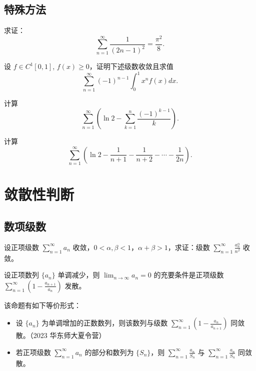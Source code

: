 \documentclass[lang=cn,10pt,thmcnt=section]{elegantbook}
\begin{document}
\subsection{特殊方法}
\begin{example}
	求证：
\[
\sum_{n=1}^{\infty} \frac{1}{(2n-1)^2} = \frac{\pi^2}{8}.
\]
\end{example}
\begin{example}
	设 $f \in C^1[0,1]$, $f(x) \geq 0$，证明下述级数收敛且求值
\[
\sum_{n=1}^{\infty} (-1)^{n-1} \int_0^1 x^n f(x) dx.
\]
\end{example}
\begin{example}
	计算
\[
\sum_{n=1}^{\infty} \left( \ln 2 - \sum_{k=1}^n \frac{(-1)^{k-1}}{k} \right).
\]
\end{example}
\begin{example}
	计算
\[
\sum_{n=1}^{\infty} \left( \ln 2 - \frac{1}{n+1} - \frac{1}{n+2} - \cdots - \frac{1}{2n} \right).
\]          
\end{example}
\section{敛散性判断}
\subsection{数项级数}
\begin{example}
	设正项级数 $\sum_{n=1}^{\infty} a_n$ 收敛，$0 < \alpha, \beta < 1$，$\alpha + \beta > 1$，求证：级数 $\sum_{n=1}^{\infty} \frac{a_n^{\alpha}}{n^{\beta}}$ 收敛。
	\end{example}
	
	\begin{example}
	设正项数列 $\{a_n\}$ 单调减少，则 $\lim_{n \to \infty} a_n = 0$ 的充要条件是正项级数 $\sum_{n=1}^{\infty} \left(1 - \frac{a_{n+1}}{a_n}\right)$ 发散。
	\end{example}
	
	该命题有如下等价形式：
	
	\begin{itemize}
		\item 设 $\{a_n\}$ 为单调增加的正数数列，则该数列与级数 $\sum_{n=1}^{\infty} \left(1 - \frac{a_n}{a_{n+1}}\right)$ 同敛散。（2023 华东师大夏令营）
		\item 若正项级数 $\sum_{n=1}^{\infty} a_n$ 的部分和数列为 $\{S_n\}$，则 $\sum_{n=1}^{\infty} \frac{a_n}{S_n}$ 与 $\sum_{n=1}^{\infty} \frac{a_n}{S_n}$ 同敛散。
	\end{itemize}
	
\end{document}
